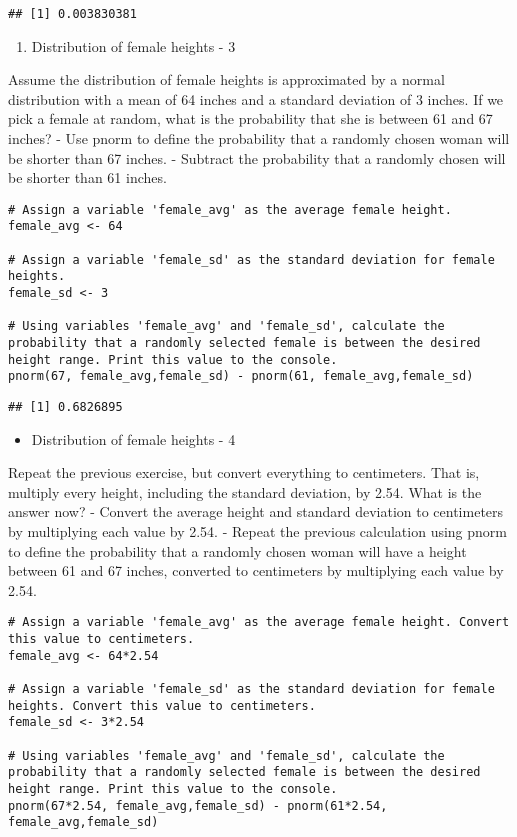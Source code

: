 \documentclass[
]{article}
\providecommand{\tightlist}{%
  \setlength{\itemsep}{0pt}\setlength{\parskip}{0pt}}
\begin{document}
\begin{verbatim}
## [1] 0.003830381
\end{verbatim}

\begin{enumerate}
\def\labelenumi{\arabic{enumi}.}
\setcounter{enumi}{2}
\tightlist
\item
  Distribution of female heights - 3
\end{enumerate}

Assume the distribution of female heights is approximated by a normal
distribution with a mean of 64 inches and a standard deviation of 3
inches. If we pick a female at random, what is the probability that she
is between 61 and 67 inches? - Use pnorm to define the probability that
a randomly chosen woman will be shorter than 67 inches. - Subtract the
probability that a randomly chosen will be shorter than 61 inches.

\begin{verbatim}
# Assign a variable 'female_avg' as the average female height.
female_avg <- 64

# Assign a variable 'female_sd' as the standard deviation for female heights.
female_sd <- 3

# Using variables 'female_avg' and 'female_sd', calculate the probability that a randomly selected female is between the desired height range. Print this value to the console.
pnorm(67, female_avg,female_sd) - pnorm(61, female_avg,female_sd)
\end{verbatim}

\begin{verbatim}
## [1] 0.6826895
\end{verbatim}

\begin{itemize}
\tightlist
\item
  Distribution of female heights - 4
\end{itemize}

Repeat the previous exercise, but convert everything to centimeters.
That is, multiply every height, including the standard deviation, by
2.54. What is the answer now? - Convert the average height and standard
deviation to centimeters by multiplying each value by 2.54. - Repeat the
previous calculation using pnorm to define the probability that a
randomly chosen woman will have a height between 61 and 67 inches,
converted to centimeters by multiplying each value by 2.54.

\begin{verbatim}
# Assign a variable 'female_avg' as the average female height. Convert this value to centimeters.
female_avg <- 64*2.54

# Assign a variable 'female_sd' as the standard deviation for female heights. Convert this value to centimeters.
female_sd <- 3*2.54

# Using variables 'female_avg' and 'female_sd', calculate the probability that a randomly selected female is between the desired height range. Print this value to the console.
pnorm(67*2.54, female_avg,female_sd) - pnorm(61*2.54, female_avg,female_sd)
\end{verbatim}
\end{document}
